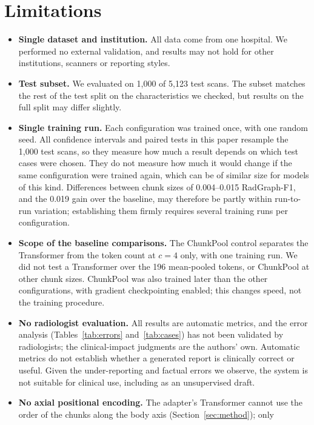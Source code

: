 \documentclass[conference]{IEEEtran}
\begin{document}
\section{Limitations}\label{sec:limitations}

\begin{itemize}
\item \textbf{Single dataset and institution.} All data come from one
hospital. We performed no external validation, and results may not hold for
other institutions, scanners or reporting styles.
\item \textbf{Test subset.} We evaluated on 1,000 of 5,123 test scans. The
subset matches the rest of the test split on the characteristics we checked,
but results on the full split may differ slightly.
\item \textbf{Single training run.} Each configuration was trained once, with
one random seed. All confidence intervals and paired tests in this paper
resample the 1,000 test scans, so they measure how much a result depends on
which test cases were chosen. They do not measure how much it would change if
the same configuration were trained again, which can be of similar size for
models of this kind. Differences between chunk sizes of 0.004--0.015
RadGraph-F1, and the 0.019 gain over the baseline, may therefore be partly
within run-to-run variation; establishing them firmly requires several
training runs per configuration.
\item \textbf{Scope of the baseline comparisons.} The ChunkPool control
separates the Transformer from the token count at $c=4$ only, with one
training run. We did not test a Transformer over the 196 mean-pooled tokens,
or ChunkPool at other chunk sizes. ChunkPool was also trained later than the
other configurations, with gradient checkpointing enabled; this changes speed,
not the training procedure.
\item \textbf{No radiologist evaluation.} All results are automatic metrics,
and the error analysis (Tables~\ref{tab:errors} and~\ref{tab:cases}) has not
been validated by radiologists; the clinical-impact judgments are the
authors' own. Automatic metrics do not establish whether a generated report
is clinically correct or useful. Given the under-reporting and factual errors
we observe, the system is not suitable for clinical use, including as an
unsupervised draft.
\item \textbf{No axial positional encoding.} The adapter's Transformer cannot
use the order of the chunks along the body axis (Section~\ref{sec:method}); only

\end{itemize}
\end{document}
